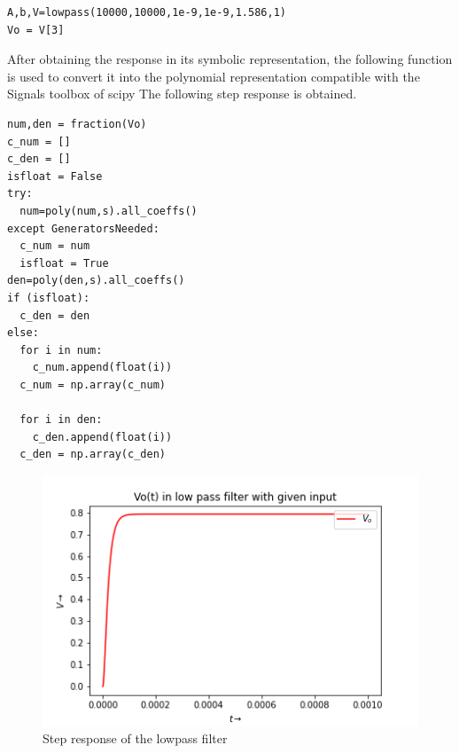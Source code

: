 \documentclass[11pt, a4paper]{article}
\begin{document}
\begin{verbatim}
A,b,V=lowpass(10000,10000,1e-9,1e-9,1.586,1)
Vo = V[3]
\end{verbatim}

After obtaining the response in its symbolic representation, the following
function is used to convert it into the polynomial representation compatible
with the Signals toolbox of scipy
The following step response is obtained.

\begin{verbatim}	
num,den = fraction(Vo)
c_num = []
c_den = []
isfloat = False
try:
  num=poly(num,s).all_coeffs()
except GeneratorsNeeded:
  c_num = num
  isfloat = True
den=poly(den,s).all_coeffs()
if (isfloat):
  c_den = den
else:
  for i in num:
    c_num.append(float(i))
  c_num = np.array(c_num)

  for i in den:
    c_den.append(float(i))
  c_den = np.array(c_den)
\end{verbatim}

\begin{figure}[!tbh]
   	\centering
   	\includegraphics[scale=0.6]{step_respl.png}  %
   	\caption{Step response of the lowpass filter}
   	\label{fig:sample}
   \end{figure}
\end{document}
